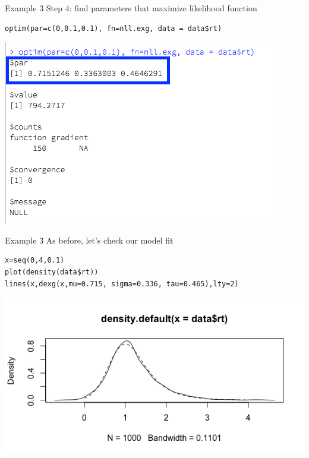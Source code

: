 \documentclass[presentation]{beamer}
\begin{document}
\begin{frame}[fragile,label=sec-30]{Example 3}
 Step 4: find parameters that maximize likelihood function

\begin{verbatim}
optim(par=c(0,0.1,0.1), fn=nll.exg, data = data$rt)
\end{verbatim}

\includegraphics[width=.9\linewidth]{figures/week2/exGoutput.png}
\end{frame}


\begin{frame}[fragile,label=sec-31]{Example 3}
 As before, let's check our model fit

\begin{verbatim}
x=seq(0,4,0.1)
plot(density(data$rt))
lines(x,dexg(x,mu=0.715, sigma=0.336, tau=0.465),lty=2)
\end{verbatim}

\includegraphics[width=.9\linewidth]{figures/week2/exGfit.png}
\end{frame}
\end{document}
